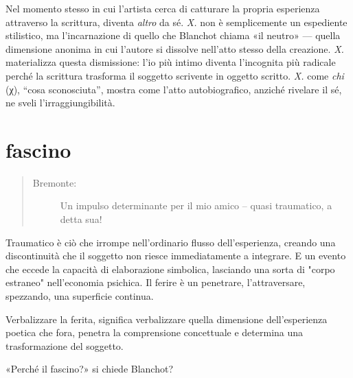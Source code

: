 Nel momento stesso in cui l'artista cerca di catturare la propria esperienza
attraverso la scrittura, diventa \emph{altro} da sé. \emph{X.} non è
semplicemente un espediente stilistico, ma l'incarnazione di quello che Blanchot \cite{fare_ref}
chiama «il neutro» — quella dimensione anonima in cui l'autore si dissolve
nell'atto stesso della creazione. \emph{X.} materializza questa dismissione:
l'io più intimo diventa l'incognita più radicale perché la scrittura trasforma
il soggetto scrivente in oggetto scritto. \emph{X.} come \emph{chi} (χ), “cosa
sconosciuta”, mostra come l'atto autobiografico, anziché rivelare il sé, ne
sveli l'irraggiungibilità.


\section*{fascino}

\begin{quote}
  \begin{sf}
    \small
    \begin{description}
      \item[Bremonte:] %
      Un impulso determinante per il mio amico – quasi traumatico, a detta sua!
    \end{description}
  \end{sf}
\end{quote}

Traumatico è ciò che irrompe nell'ordinario flusso dell'esperienza, creando una discontinuità che il soggetto non riesce immediatamente a integrare. E un evento che eccede la capacità di elaborazione simbolica, lasciando una sorta di "corpo estraneo" nell'economia psichica. Il ferire è un penetrare, l'attraversare, spezzando, una superficie continua.

Verbalizzare la ferita, significa verbalizzare quella dimensione dell'esperienza poetica che fora, penetra la
comprensione concettuale e determina una trasformazione del soggetto.

«Perché il fascino?» si chiede Blanchot? \cite{blanchot82}

